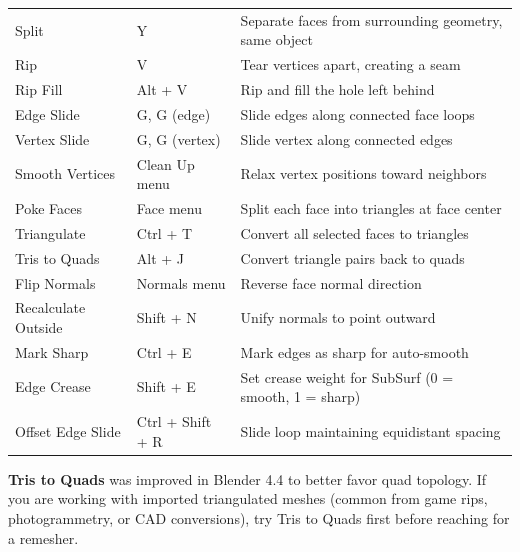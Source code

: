 \begin{center}
\begin{tabularx}{\textwidth}{L{3cm}C{3cm}X}
\toprule
{}
 &  &  \\
\midrule
Split & Y & Separate faces from surrounding geometry, same object \\
Rip & V & Tear vertices apart, creating a seam \\
Rip Fill & Alt + V & Rip and fill the hole left behind \\
Edge Slide & G, G (edge) & Slide edges along connected face loops \\
Vertex Slide & G, G (vertex) & Slide vertex along connected edges \\
Smooth Vertices & Clean Up menu & Relax vertex positions toward neighbors \\
Poke Faces & Face menu & Split each face into triangles at face center \\
Triangulate & Ctrl + T & Convert all selected faces to triangles \\
Tris to Quads & Alt + J & Convert triangle pairs back to quads \\
Flip Normals & Normals menu & Reverse face normal direction \\
Recalculate Outside & Shift + N & Unify normals to point outward \\
Mark Sharp & Ctrl + E & Mark edges as sharp for auto-smooth \\
Edge Crease & Shift + E & Set crease weight for SubSurf (0 = smooth, 1 = sharp) \\
Offset Edge Slide & Ctrl + Shift + R & Slide loop maintaining equidistant spacing \\
\bottomrule
\end{tabularx}
\end{center}

\begin{tipbox}
\textbf{Tris to Quads} was improved in Blender 4.4 to better favor quad topology. If you are working with imported triangulated meshes (common from game rips, photogrammetry, or CAD conversions), try Tris to Quads first before reaching for a remesher.
\end{tipbox}



